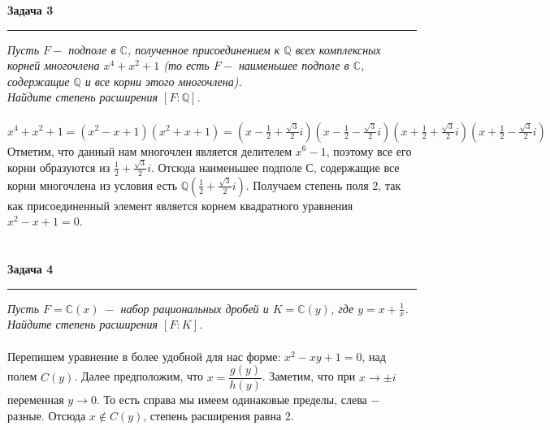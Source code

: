 \documentclass[a4paper,11pt]{article}
\begin{document}



\textbf{\large Задача 3}
\medskip\hrule\medskip
\textit{Пусть $ F - $ подполе в $ \mathbb{C} $, полученное присоединением к $ \mathbb{Q} $ всех комплексных корней многочлена $ x^4 + x^2 + 1 $ (то есть $ F - $ наименьшее подполе в $ \mathbb{C} $, содержащие $ \mathbb{Q} $ и все корни этого многочлена). \\[2pt] Найдите степень расширения $ [F: \mathbb{Q}] $. }  \\ \\ 
$ x^4 + x^2 + 1 = (x^2 - x + 1)(x^2 + x + 1) = (x - \frac12 + \frac{\sqrt{3}}{2}i)(x - \frac12 - \frac{\sqrt{3}}{2}i)(x + \frac12 + \frac{\sqrt{3}}{2}i)(x + \frac12 - \frac{\sqrt{3}}{2}i) $ \\[3pt]
Отметим, что данный нам многочлен является делителем $ x^6 - 1 $, поэтому все его корни  образуются из $ \frac12 + \frac{\sqrt{3}}2i $. Отсюда наименьшее подполе $ С $, содержащие все корни многочлена из условия есть $ \mathbb{Q}(\frac12 + \frac{\sqrt{3}}2i) $. Получаем степень поля 2, так как присоединенный элемент является корнем квадратного уравнения $ x^2 - x + 1 = 0 $.
\\ \\ \\







\textbf{\large Задача 4}
\medskip\hrule\medskip
\textit{Пусть $ F = \mathbb{C}(x) \; - $ набор рациональных дробей и $ K = \mathbb{C}(y) $, где $ y = x + \frac1{x} $. Найдите степень расширения $ [F : K] $.} \\ \\
Перепишем уравнение в более удобной для нас форме: $ x^2 - xy + 1 = 0 $, над полем $ C(y) $. Далее предположим, что $ x = \dfrac{g(y)}{h(y)} $. Заметим, что при $ x \to \pm i $ переменная $ y \to 0 $. То есть справа мы имеем одинаковые пределы, слева $ - $ разные. Отсюда $ x \notin C(y) $, степень расширения равна 2.
\end{document}
